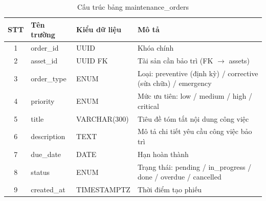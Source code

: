 \renewcommand{\arraystretch}{1.3}
\begin{longtable}{|c|p{3.5cm}|p{4cm}|p{6cm}|}
    \caption{Cấu trúc bảng maintenance\_orders}
    \label{tab:db_maintenance_orders} \\

    \hline
    \textbf{STT} & \textbf{Tên trường} & \textbf{Kiểu dữ liệu} & \textbf{Mô tả} \\ \hline
    \endfirsthead

    \hline
    \endhead
    \hline
    \endfoot
    \hline
    \endlastfoot

    1 & order\_id & UUID & Khóa chính \\ \hline
    2 & asset\_id & UUID FK & Tài sản cần bảo trì (FK $\rightarrow$ assets) \\ \hline
    3 & order\_type & ENUM & Loại: preventive (định kỳ) / corrective (sửa chữa) / emergency \\ \hline
    4 & priority & ENUM & Mức ưu tiên: low / medium / high / critical \\ \hline
    5 & title & VARCHAR(300) & Tiêu đề tóm tắt nội dung công việc \\ \hline
    6 & description & TEXT & Mô tả chi tiết yêu cầu công việc bảo trì \\ \hline
    7 & due\_date & DATE & Hạn hoàn thành \\ \hline
    8 & status & ENUM & Trạng thái: pending / in\_progress / done / overdue / cancelled \\ \hline
    9 & created\_at & TIMESTAMPTZ & Thời điểm tạo phiếu \\
\end{longtable}